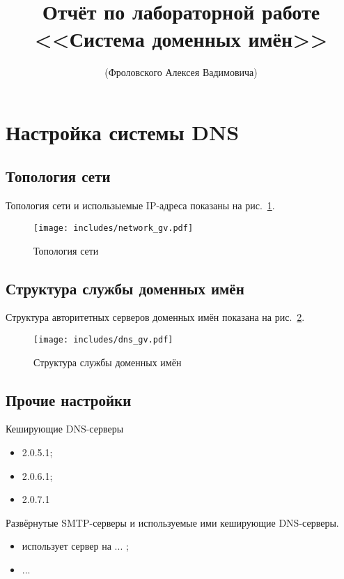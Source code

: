 \documentclass[a4paper,12pt]{article}
\title{Отчёт по лабораторной работе \\ <<Система доменных имён>>}
\author{(Фроловского Алексея Вадимовича)}
\begin{document}
\maketitle

\tableofcontents

\section{Настройка системы DNS}

\subsection{Топология сети}

Топология сети и использыемые IP-адреса показаны на рис.~\ref{fig:network}.

\begin{figure}
\centering
\texttt{[image: includes/network\_gv.pdf]}
\caption{Топология сети}
\label{fig:network}
\end{figure}

\subsection{Структура службы доменных имён}

Структура авторитетных серверов доменных имён показана на рис.~\ref{fig:dns}.

\begin{figure}
\centering
\texttt{[image: includes/dns\_gv.pdf]}
\caption{Структура службы доменных имён}
\label{fig:dns}
\end{figure}

\subsection{Прочие настройки}

Кеширующие DNS-серверы
\begin{itemize}
\item 2.0.5.1;
\item 2.0.6.1;
\item 2.0.7.1
\end{itemize}

Развёрнутые SMTP-серверы и используемые ими кеширующие DNS-серверы.
\begin{itemize}
\item  использует сервер на ... ;
\item ...
\end{itemize}
\end{document}

